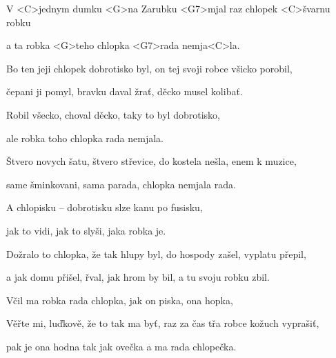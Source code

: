 

\zs
V <C>jednym dumku <G>na Zarubku <G7>mjal raz chlopek <C>švarnu robku

a ta robka <G>teho chlopka <G7>rada nemja<C>la.

Bo ten jeji chlopek dobrotisko byl, on tej svoji robce všicko porobil,

čepani ji pomyl, bravku daval žrať, děcko musel kolibať.
\ks

\zs
Robil všecko, choval děcko, taky to byl dobrotisko,

ale robka toho chlopka rada nemjala.

Štvero novych šatu, štvero střevice, do kostela nešla, enem k muzice,

same šminkovani, sama parada, chlopka nemjala rada.
\ks

\zs
A chlopisku -- dobrotisku slze kanu po fusisku,

jak to vidi, jak to slyši, jaka robka je.

Dožralo to chlopka, že tak hlupy byl, do hospody zašel, vyplatu přepil,

a jak domu přišel, řval, jak hrom by bil, a tu svoju robku zbil.
\ks

\zs
Včil ma robka rada chlopka, jak on piska, ona hopka,


Věřte mi, luďkově, že to tak ma byť, raz za čas třa robce kožuch vyprašiť,

pak je ona hodna tak jak ovečka a ma rada chlopečka.
\ks

\kp
